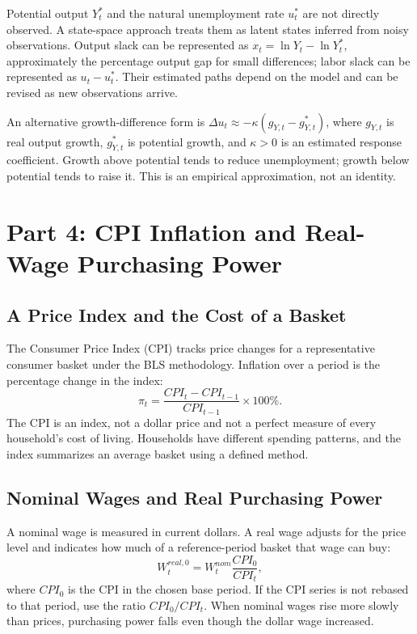 \documentclass[11pt,letterpaper]{article}
\begin{document}
\begin{tcolorbox}[colback=gray!5!white,colframe=gray!75!black,title=\textbf{Optional Advanced: State-Space Slack and Growth-Rate Okun Relations}]
\small
Potential output $Y_t^*$ and the natural unemployment rate $u_t^*$ are not directly observed. A state-space approach treats them as latent states inferred from noisy observations. Output slack can be represented as $x_t=\ln Y_t-\ln Y_t^*$, approximately the percentage output gap for small differences; labor slack can be represented as $u_t-u_t^*$. Their estimated paths depend on the model and can be revised as new observations arrive.

An alternative growth-difference form is $\Delta u_t\approx-\kappa(g_{Y,t}-g_{Y,t}^*)$, where $g_{Y,t}$ is real output growth, $g_{Y,t}^*$ is potential growth, and $\kappa>0$ is an estimated response coefficient. Growth above potential tends to reduce unemployment; growth below potential tends to raise it. This is an empirical approximation, not an identity.
\end{tcolorbox}

\section{Part 4: CPI Inflation and Real-Wage Purchasing Power}
\subsection{A Price Index and the Cost of a Basket}
The Consumer Price Index (CPI) tracks price changes for a representative consumer basket under the BLS methodology. Inflation over a period is the percentage change in the index:
\begin{equation}
\pi_t=\frac{CPI_t-CPI_{t-1}}{CPI_{t-1}}\times100\%.
\end{equation}
The CPI is an index, not a dollar price and not a perfect measure of every household's cost of living. Households have different spending patterns, and the index summarizes an average basket using a defined method.

\subsection{Nominal Wages and Real Purchasing Power}
A nominal wage is measured in current dollars. A real wage adjusts for the price level and indicates how much of a reference-period basket that wage can buy:
\begin{equation}
W^{real,0}_t=W^{nom}_t\frac{CPI_0}{CPI_t},
\end{equation}
where $CPI_0$ is the CPI in the chosen base period. If the CPI series is not rebased to that period, use the ratio $CPI_0/CPI_t$. When nominal wages rise more slowly than prices, purchasing power falls even though the dollar wage increased.
\end{document}
